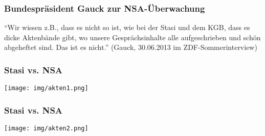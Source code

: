 \begin{frame}
    \frametitle{Bundespräsident Gauck zur NSA-Überwachung}
    \begin{center}
      ``Wir wissen z.B., dass es nicht so ist, wie bei der Stasi und dem KGB, dass es dicke Aktenbände gibt, wo unsere Gesprächsinhalte alle aufgeschrieben und schön abgeheftet sind. Das ist es nicht.''
      (Gauck, 30.06.2013 im ZDF-Sommerinterview)
    \end{center}
\end{frame}

\begin{frame}
    \frametitle{Stasi vs. NSA}
    \begin{center}
      \texttt{[image: img/akten1.png]}
    \end{center}
\end{frame}

\begin{frame}
    \frametitle{Stasi vs. NSA}
    \begin{center}
      \texttt{[image: img/akten2.png]}
    \end{center}
\end{frame}
